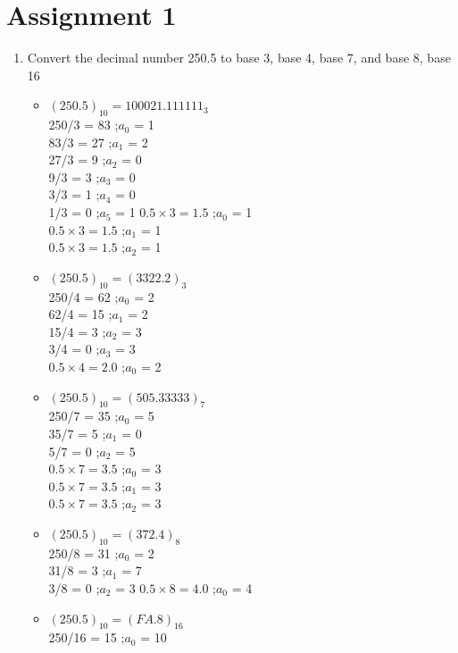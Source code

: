 \documentclass[12pt]{article}
\begin{document}
\section*{Assignment 1}
\begin{enumerate}
	\item Convert the decimal number 250.5 to base 3, base 4, base 7, and base 8, base 16
	\begin{itemize}
		\item $(250.5)_{10} = 100021.111111_3$\\
		250/3 = 83 ;$a_0$ = 1\\
		83/3 = 27 ;$a_1$ = 2\\
		27/3 = 9 ;$a_2$ = 0\\
		9/3 = 3 ;$a_3$ = 0\\
		3/3 = 1 ;$a_4$ = 0\\
		1/3 = 0 ;$a_5$ = 1
		\bigbreak
		$0.5 \times 3 = 1.5$  ;$a_0$ = 1 \\
		$0.5 \times 3 = 1.5$  ;$a_1$ = 1 \\
		$0.5 \times 3 = 1.5$  ;$a_2$ = 1\\
		\item $(250.5)_{10} = (3322.2)_3$\\
		250/4 = 62 ;$a_0$ = 2\\
		62/4 = 15 ;$a_1$ = 2\\
		15/4 = 3 ;$a_2$ = 3\\
		3/4 = 0 ;$a_3$ = 3\\
		\bigbreak
		$0.5 \times 4 = 2.0$  ;$a_0$ = 2\\
		\item $(250.5)_{10} = (505.33333)_7$\\
		250/7 = 35 ;$a_0$ = 5\\
		35/7 = 5 ;$a_1$ = 0\\
		5/7 = 0 ;$a_2$ = 5\\
		\bigbreak
		$0.5 \times 7 = 3.5$  ;$a_0$ = 3\\
		$0.5 \times 7 = 3.5$  ;$a_1$ = 3\\
		$0.5 \times 7 = 3.5$  ;$a_2$ = 3\\
		\item $(250.5)_{10} = (372.4)_8$\\
		250/8 = 31 ;$a_0$ = 2\\
		31/8 = 3  ;$a_1$ = 7\\
		3/8 = 0  ;$a_2$ = 3
		\bigbreak
		$0.5 \times 8 = 4.0$  ;$a_0$ = 4
		\item $(250.5)_{10} = (FA.8)_{16}$\\
		250/16 = 15  ;$a_0$ = 10\\

\end{itemize}
\end{enumerate}
\end{document}
